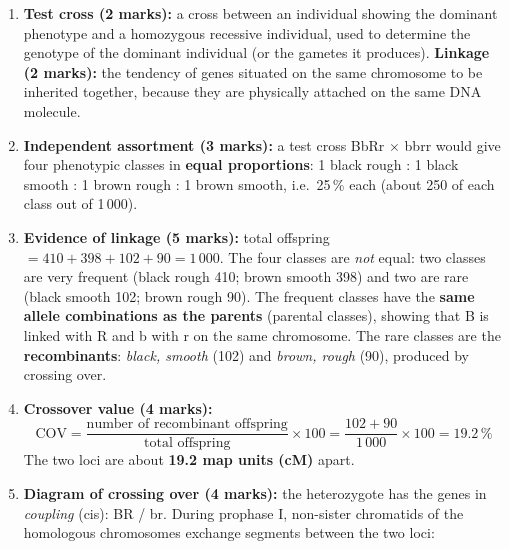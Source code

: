 \documentclass[11pt]{article}
\begin{document}
\begin{corrige}
\begin{enumerate}
\item \textbf{Test cross (2 marks):} a cross between an individual showing the dominant phenotype and a homozygous recessive individual, used to determine the genotype of the dominant individual (or the gametes it produces). \textbf{Linkage (2 marks):} the tendency of genes situated on the same chromosome to be inherited together, because they are physically attached on the same DNA molecule.
\item \textbf{Independent assortment (3 marks):} a test cross BbRr $\times$ bbrr would give four phenotypic classes in \textbf{equal proportions}: 1 black rough : 1 black smooth : 1 brown rough : 1 brown smooth, i.e.\ 25\,\% each (about 250 of each class out of 1\,000).
\item \textbf{Evidence of linkage (5 marks):} total offspring $= 410 + 398 + 102 + 90 = 1\,000$. The four classes are \emph{not} equal: two classes are very frequent (black rough 410; brown smooth 398) and two are rare (black smooth 102; brown rough 90). The frequent classes have the \textbf{same allele combinations as the parents} (parental classes), showing that B is linked with R and b with r on the same chromosome. The rare classes are the \textbf{recombinants}: \emph{black, smooth} (102) and \emph{brown, rough} (90), produced by crossing over.
\item \textbf{Crossover value (4 marks):}
\[ \text{COV} = \frac{\text{number of recombinant offspring}}{\text{total offspring}} \times 100 = \frac{102 + 90}{1\,000} \times 100 = 19.2\,\% \]
The two loci are about \textbf{19.2 map units (cM)} apart.
\item \textbf{Diagram of crossing over (4 marks):} the heterozygote has the genes in \emph{coupling} (cis): BR / br. During prophase I, non-sister chromatids of the homologous chromosomes exchange segments between the two loci:


\end{enumerate}
\end{corrige}
\end{document}
